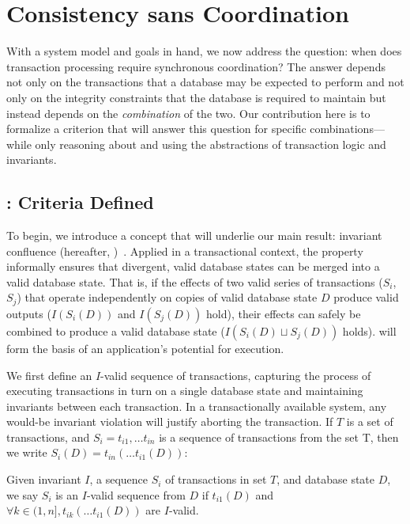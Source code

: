 
\section{Consistency sans Coordination}
\label{sec:bcc-theory}

With a system model and goals in hand, we now address the question:
when does transaction processing require synchronous coordination? The
answer depends not only on the transactions that a database may be
expected to perform and not only on the integrity constraints that the
database is required to maintain but instead depends on the
\textit{combination} of the two. Our contribution here is to formalize
a criterion that will answer this question for specific
combinations---while only reasoning about and using the abstractions
of transaction logic and invariants.

\subsection{\iconfluence: Criteria Defined}

To begin, we introduce a concept that will underlie our main result:
invariant confluence (hereafter,
\iconfluence)~\cite{obs-confluence}. Applied in a transactional
context, the \iconfluence property informally ensures that divergent,
valid database states can be merged into a valid database state. That
is, if the effects of two valid series of transactions ($S_i$, $S_j$)
that operate independently on copies of valid database state $D$
produce valid outputs ($I(S_i(D))$ and $I(S_j(D))$ hold), their
effects can safely be combined to produce a valid database state
($I(S_i(D) \sqcup S_j(D))$ holds). \iconfluence will form the basis of
an application's potential for \cfree execution.

We first define an $I$-valid sequence of transactions, capturing the
process of executing transactions in turn on a single database state
and maintaining invariants between each transaction. In a
transactionally available system, any would-be invariant violation
will justify aborting the transaction.  If $T$ is a set of
transactions, and $S_i = t_{i1},\dots t_{in}$ is a sequence of
transactions from the set T, then we write $S_i(D) = t_{in}(\dots
t_{i1}(D))$:

\begin{definition}
Given invariant $I$, a sequence $S_i$ of transactions in set $T$, and
database state $D$, we say $S_i$ is an $I$-valid sequence from $D$ if
$t_{i1}(D)$ and $\forall k \in (1, n], t_{ik}(\dots t_{i1}(D))$ are
$I$-valid.
\end{definition}

